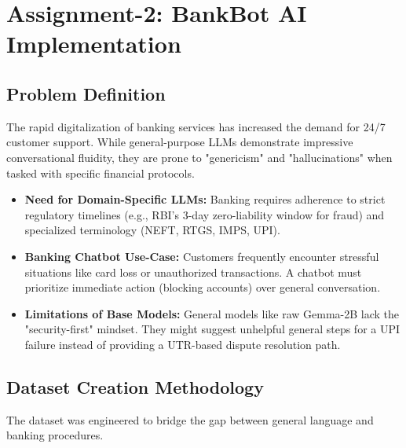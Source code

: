\documentclass[12pt,a4paper]{article}
\begin{document}
\newpage

\tableofcontents
\newpage


\section{Assignment-2: BankBot AI Implementation}

\subsection{Problem Definition}
The rapid digitalization of banking services has increased the demand for 24/7 customer support. While general-purpose LLMs demonstrate impressive conversational fluidity, they are prone to "genericism" and "hallucinations" when tasked with specific financial protocols.

\begin{itemize}
    \item \textbf{Need for Domain-Specific LLMs:} Banking requires adherence to strict regulatory timelines (e.g., RBI's 3-day zero-liability window for fraud) and specialized terminology (NEFT, RTGS, IMPS, UPI).
    \item \textbf{Banking Chatbot Use-Case:} Customers frequently encounter stressful situations like card loss or unauthorized transactions. A chatbot must prioritize immediate action (blocking accounts) over general conversation.
    \item \textbf{Limitations of Base Models:} General models like raw Gemma-2B lack the "security-first" mindset. They might suggest unhelpful general steps for a UPI failure instead of providing a UTR-based dispute resolution path.
\end{itemize}

\subsection{Dataset Creation Methodology}
The dataset was engineered to bridge the gap between general language and banking procedures.
\end{document}
